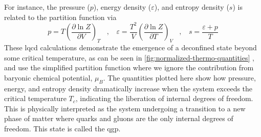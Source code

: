 For instance, the pressure ($p$), energy density ($\varepsilon$), and entropy density ($s$) is related to the partition function via
\begin{equation}
  \label{eqn:thermodynamic-identities-nominal}
  p = T\left( \frac{\partial \ln Z}{\partial V} \right)_T \ \ \ \ , \ \ \ \  \varepsilon = \frac{T^2}{V}\left( \frac{\partial \ln Z}{\partial T} \right)_V \ \ \ \ , \ \ \ \ s = \frac{\varepsilon + p}{T}
\end{equation}
These \gls{lqcd} calculations demonstrate the emergence of a deconfined state beyond some critical temperature, as can be seen in \ref{fig:normalized-thermo-quantities} \cite{PhysRevD.90.094503}, and use the simplified partition function where we ignore the contribution from baryonic chemical potential, $\mu_B$.
The quantities plotted here show how pressure, energy, and entropy density dramatically increase when the system exceeds the critical temperature $T_c$, indicating the liberation of internal degrees of freedom.
This is physically interpreted as the system undergoing a transition to a new phase of matter where quarks and gluons are the only internal degrees of freedom.
This state is called the \gls{qgp}.



